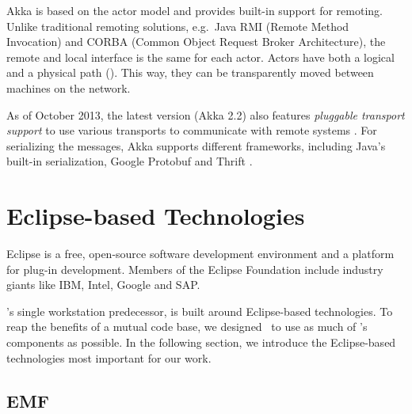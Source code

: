 
Akka is based on the actor model \cite{Hewitt:1973:UMA:1624775.1624804} and provides built-in support for remoting. %
Unlike traditional remoting solutions, e.g.\ Java RMI (Remote Method Invocation) and CORBA (Common Object Request Broker Architecture), the remote and local interface is the same for each actor. Actors have both a logical and a physical path (). This way, they can be transparently moved between machines on the network.

As of October 2013, the latest version (Akka 2.2) also features \textit{pluggable transport support} to use various transports to communicate with remote systems \cite{Akka}. For serializing the messages, Akka supports different frameworks, including Java's built-in serialization, Google Protobuf \cite{Protobuf} and Thrift \cite{Thrift}.



\section{Eclipse-based Technologies}

Eclipse is a free, open-source software development environment and a platform for plug-in development. Members of the Eclipse Foundation include industry giants like IBM, Intel, Google and SAP.

\iqd{}'s single workstation predecessor, \eiq{} is built around Eclipse-based technologies. To reap the benefits of a mutual code base, we designed \iqd\ to use as much of \eiq's components as possible. In the following section, we introduce the Eclipse-based technologies most important for our work.

\subsection{EMF}
\label{subsec:EMF}

